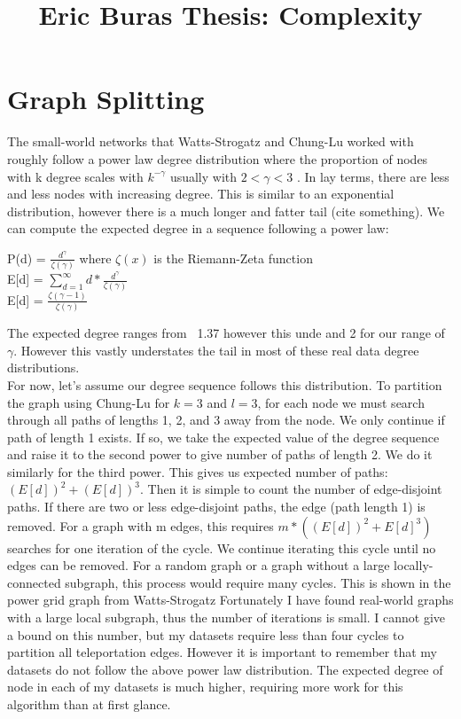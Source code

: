 \documentclass{article}
\begin{document}
\title{Eric Buras Thesis: Complexity}

\maketitle

\section{Graph Splitting}
The small-world networks that Watts-Strogatz and Chung-Lu worked with roughly follow a power law degree distribution where the proportion of nodes with k degree scales with $k^{-\gamma}$ usually with $2 < \gamma < 3$ \cite{Chung:2004,Watts:1998}. In lay terms, there are less and less nodes with increasing degree. This is similar to an exponential distribution, however there is a much longer and fatter tail (cite something). We can compute the expected degree in a sequence following a power law:\\
\begin{center}


P(d) = $\frac{d^{\gamma}}{\zeta(\gamma)}$ where $\zeta(x)$ is the Riemann-Zeta function\\
E[d] = $\sum_{d=1}^{\infty} d* \frac{d^{\gamma}}{\zeta(\gamma)}$ \\
E[d] = $\frac{\zeta(\gamma-1)}{\zeta(\gamma)}$\\ 


\end{center}
The expected degree ranges from ~1.37  however this unde and 2 for our range of $\gamma$. However this vastly understates the tail in most of these real data degree distributions.\\
For now, let's assume our degree sequence follows this distribution. To partition the graph using Chung-Lu for $k = 3$ and $l = 3$, for each node we must search through all paths of lengths 1, 2, and 3 away from the node. We only continue if path of length 1 exists. If so, we take the expected value of the degree sequence and raise it to the second power to give number of paths of length 2. We do it similarly for the third power. This gives us expected number of paths: $(E[d])^{2}+(E[d])^{3}$. Then it is simple to count the number of edge-disjoint paths. If there are two or less edge-disjoint paths, the edge (path length 1) is removed. For a graph with m edges, this requires $m*((E[d])^{2}+E[d]^{3})$ searches for one iteration of the cycle. We continue iterating this cycle until no edges can be removed. For a random graph or a graph without a large locally-connected subgraph, this process would require many cycles. This is shown in the power grid graph from Watts-Strogatz \cite{Watts:1998} Fortunately I have found real-world graphs with a large local subgraph, thus the number of iterations is small. I cannot give a bound on this number, but my datasets require less than four cycles to partition all teleportation edges. However it is important to remember that my datasets do not follow the above power law distribution. The expected degree of node in each of my datasets is much higher, requiring more work for this algorithm than at first glance.
\end{document}
